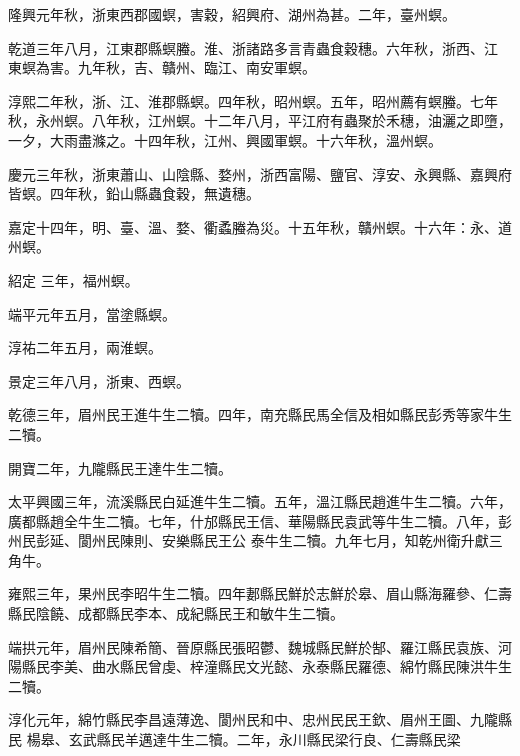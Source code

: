 \begin{pinyinscope}
 隆興元年秋，浙東西郡國螟，害穀，紹興府、湖州為甚。二年，臺州螟。



 乾道三年八月，江東郡縣螟螣。淮、浙諸路多言青蟲食穀穗。六年秋，浙西、江
 東螟為害。九年秋，吉、贛州、臨江、南安軍螟。



 淳熙二年秋，浙、江、淮郡縣螟。四年秋，昭州螟。五年，昭州薦有螟螣。七年秋，永州螟。八年秋，江州螟。十二年八月，平江府有蟲聚於禾穗，油灑之即墮，一夕，大雨盡滌之。十四年秋，江州、興國軍螟。十六年秋，溫州螟。



 慶元三年秋，浙東蕭山、山陰縣、婺州，浙西富陽、鹽官、淳安、永興縣、嘉興府皆螟。四年秋，鉛山縣蟲食穀，無遺穗。



 嘉定十四年，明、臺、溫、婺、衢蟊螣為災。十五年秋，贛州螟。十六年：永、道州螟。



 紹定
 三年，福州螟。



 端平元年五月，當塗縣螟。



 淳祐二年五月，兩淮螟。



 景定三年八月，浙東、西螟。



 乾德三年，眉州民王進牛生二犢。四年，南充縣民馬全信及相如縣民彭秀等家牛生二犢。



 開寶二年，九隴縣民王達牛生二犢。



 太平興國三年，流溪縣民白延進牛生二犢。五年，溫江縣民趙進牛生二犢。六年，廣都縣趙全牛生二犢。七年，什邡縣民王信、華陽縣民袁武等牛生二犢。八年，彭州民彭延、閬州民陳則、安樂縣民王公
 泰牛生二犢。九年七月，知乾州衛升獻三角牛。



 雍熙三年，果州民李昭牛生二犢。四年郪縣民鮮於志鮮於皋、眉山縣海羅參、仁壽縣民陰饒、成都縣民李本、成紀縣民王和敏牛生二犢。



 端拱元年，眉州民陳希簡、晉原縣民張昭鬱、魏城縣民鮮於郜、羅江縣民袁族、河陽縣民李美、曲水縣民曾虔、梓潼縣民文光懿、永泰縣民羅德、綿竹縣民陳洪牛生二犢。



 淳化元年，綿竹縣民李昌遠薄逸、閬州民和中、忠州民民王欽、眉州王圖、九隴縣民
 楊皋、玄武縣民羊邁達牛生二犢。二年，永川縣民梁行良、仁壽縣民梁




\end{pinyinscope}
